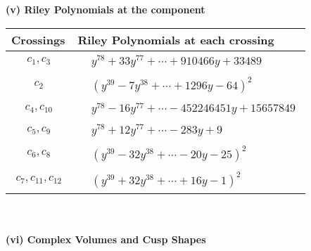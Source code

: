 \documentclass[1p]{elsarticle_modified}
\theoremstyle{definition}
\begin{document}
\newpage\renewcommand{\arraystretch}{1}
\flushleft \textbf{(v) Riley Polynomials at the component}\newline \\
\begin{tabular}{m{50pt}|m{274pt}}
Crossings & \hspace{64pt}Riley Polynomials at each crossing \\
\hline $$\begin{aligned}c_{1},c_{3}\end{aligned}$$&$\begin{aligned}
&y^{78}+33 y^{77}+\cdots+910466 y+33489
\end{aligned}$\\
\hline $$\begin{aligned}c_{2}\end{aligned}$$&$\begin{aligned}
&(y^{39}-7 y^{38}+\cdots+1296 y-64)^{2}
\end{aligned}$\\
\hline $$\begin{aligned}c_{4},c_{10}\end{aligned}$$&$\begin{aligned}
&y^{78}-16 y^{77}+\cdots-452246451 y+15657849
\end{aligned}$\\
\hline $$\begin{aligned}c_{5},c_{9}\end{aligned}$$&$\begin{aligned}
&y^{78}+12 y^{77}+\cdots-283 y+9
\end{aligned}$\\
\hline $$\begin{aligned}c_{6},c_{8}\end{aligned}$$&$\begin{aligned}
&(y^{39}-32 y^{38}+\cdots-20 y-25)^{2}
\end{aligned}$\\
\hline $$\begin{aligned}c_{7},c_{11},c_{12}\end{aligned}$$&$\begin{aligned}
&(y^{39}+32 y^{38}+\cdots+16 y-1)^{2}
\end{aligned}$\\
\hline
\end{tabular}\\~\\
\newpage\flushleft \textbf{(vi) Complex Volumes and Cusp Shapes}
\end{document}

